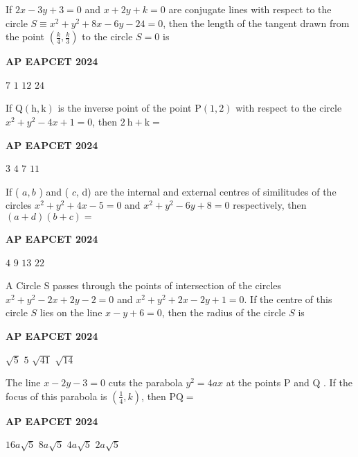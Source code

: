 \documentclass[11pt,paper=a4,answers]{exam}
\begin{document}
\begin{multicols}{2}
\begin{questions}
\question
If $2 x-3 y+3=0$ and $x+2 y+k=0$ are conjugate lines with respect to the circle $S \equiv x^2+y^2+8 x-6 y-24=0$, then the length of the tangent drawn from the point $\left(\frac{k}{4}, \frac{k}{3}\right)$ to the circle $S=0$ is
\begin{flushright}
\small\textbf{AP EAPCET 2024}
\end{flushright}
\begin{choices}
  \choice $7$
  \choice $1$ 
  \choice $12$ 
  \choice $24$
\end{choices}

\question
If $\mathrm{Q}(\mathrm{h}, \mathrm{k})$ is the inverse point of the point $\mathrm{P}(1,2)$ with respect to the circle $x^2+y^2-4 x+1=0$, then $2 \mathrm{~h}+\mathrm{k}=$
\begin{flushright}
\small\textbf{AP EAPCET 2024}
\end{flushright}
\begin{choices}
  \choice $3$
  \choice $4$ 
  \choice $7$ 
  \choice $11$
\end{choices}

\question
If ( $a, b$ ) and ( $c$, d) are the internal and external centres of similitudes of the circles $x^2+y^2+4 x-5=0$ and $x^2+y^2-6 y+8=0$ respectively, then $(a+d)(b+c)=$
\begin{flushright}
\small\textbf{AP EAPCET 2024}
\end{flushright}
\begin{choices}
  \choice $4$
  \choice $9$ 
  \choice $13$ 
  \choice $22$
\end{choices}

\question
A Circle S passes through the points of intersection of the circles $x^2+y^2-2 x+2 y-2=0$ and $x^2+y^2+2 x-2 y+1=0$. If the centre of this circle $S$ lies on the line $x-y+6=0$, then the radius of the circle $S$ is
\begin{flushright}
\small\textbf{AP EAPCET 2024}
\end{flushright}
\begin{choices}
  \choice $\sqrt{5}$
  \choice $5$ 
  \choice $\sqrt{41}$
  \choice $\sqrt{14}$
\end{choices}

\question
The line $x-2 y-3=0$ cuts the parabola $y^2=4 a x$ at the points P and Q . If the focus of this parabola is $\left(\frac{1}{4}, k\right)$, then $\mathrm{PQ}=$
\begin{flushright}
\small\textbf{AP EAPCET 2024}
\end{flushright}
\begin{choices}
  \choice $16 a \sqrt{5}$
  \choice $8 a \sqrt{5}$ 
  \choice $4 a \sqrt{5}$ 
  \choice $2 a \sqrt{5}$
\end{choices}


\end{questions}
\end{multicols}
\end{document}
